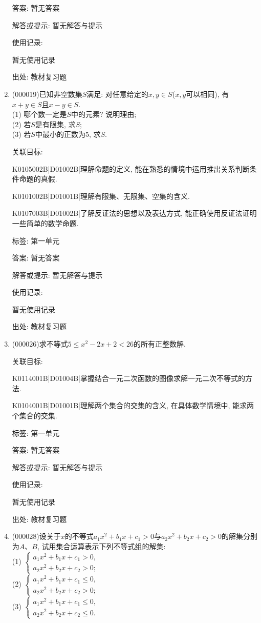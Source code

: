 \documentclass[10pt,a4paper]{article}
\begin{document}
\begin{enumerate}[1.]
答案: 暂无答案

解答或提示: 暂无解答与提示

使用记录:

暂无使用记录


出处: 教材复习题
\item { (000019)}已知非空数集$S$满足: 对任意给定的$x,y\in S$($x,y$可以相同), 有$x+y\in S$且$x-y\in S$.\\
(1) 哪个数一定是$S$中的元素? 说明理由;\\
(2) 若$S$是有限集, 求$S$;\\
(3) 若$S$中最小的正数为$5$, 求$S$.


关联目标:

K0105002B|D01002B|理解命题的定义, 能在熟悉的情境中运用推出关系判断条件命题的真假.

K0101002B|D01001B|理解有限集、无限集、空集的含义.

K0107003B|D01002B|了解反证法的思想以及表达方式, 能正确使用反证法证明一些简单的数学命题.



标签: 第一单元

答案: 暂无答案

解答或提示: 暂无解答与提示

使用记录:

暂无使用记录


出处: 教材复习题
\item { (000026)}求不等式$5\le x^2-2x+2<26$的所有正整数解.


关联目标:

K0114001B|D01004B|掌握结合一元二次函数的图像求解一元二次不等式的方法.

K0104001B|D01001B|理解两个集合的交集的含义, 在具体数学情境中, 能求两个集合的交集.



标签: 第一单元

答案: 暂无答案

解答或提示: 暂无解答与提示

使用记录:

暂无使用记录


出处: 教材复习题
\item { (000028)}设关于$x$的不等式$a_1x^2+b_1x+c_1>0$与$a_2x^2+b_2x+c_2>0$的解集分别为$A$、$B$,
试用集合运算表示下列不等式组的解集:\\
(1) $\begin{cases} a_1x^2+b_1x+c_1>0, \\ a_2x^2+b_2x+c_2>0;\end{cases}$\\
(2) $\begin{cases} a_1x^2+b_1x+c_1\le 0, \\ a_2x^2+b_2x+c_2>0;\end{cases}$\\
(3) $\begin{cases} a_1x^2+b_1x+c_1\le 0, \\ a_2x^2+b_2x+c_2\le 0.\end{cases}$



\end{enumerate}
\end{document}
